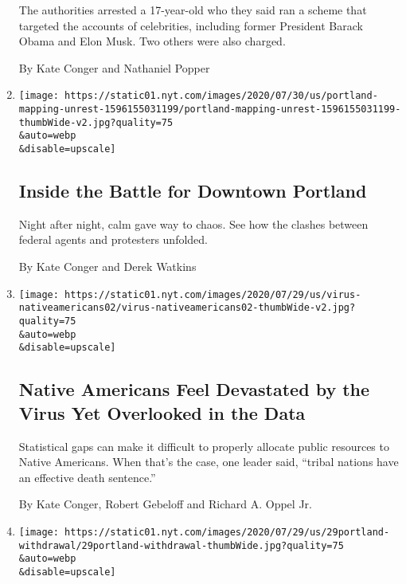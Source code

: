 \begin{enumerate}
  The authorities arrested a 17-year-old who they said ran a scheme that
  targeted the accounts of celebrities, including former President
  Barack Obama and Elon Musk. Two others were also charged.

  By Kate Conger and Nathaniel Popper
\item
  \href{/interactive/2020/07/31/us/portland-protests-map-photos.html}{}

  \texttt{[image: https://static01.nyt.com/images/2020/07/30/us/portland-mapping-unrest-1596155031199/portland-mapping-unrest-1596155031199-thumbWide-v2.jpg?quality=75\\\&auto=webp\\\&disable=upscale]}

  \hypertarget{inside-the-battle-for-downtown-portland}{%
  \subsection{Inside the Battle for Downtown
  Portland}\label{inside-the-battle-for-downtown-portland}}

  Night after night, calm gave way to chaos. See how the clashes between
  federal agents and protesters unfolded.

  By Kate Conger and Derek Watkins
\item
  \href{/2020/07/30/us/native-americans-coronavirus-data.html}{}

  \texttt{[image: https://static01.nyt.com/images/2020/07/29/us/virus-nativeamericans02/virus-nativeamericans02-thumbWide-v2.jpg?quality=75\\\&auto=webp\\\&disable=upscale]}

  \hypertarget{native-americans-feel-devastated-by-the-virus-yet-overlooked-in-the-data}{%
  \subsection{Native Americans Feel Devastated by the Virus Yet
  Overlooked in the
  Data}\label{native-americans-feel-devastated-by-the-virus-yet-overlooked-in-the-data}}

  Statistical gaps can make it difficult to properly allocate public
  resources to Native Americans. When that's the case, one leader said,
  ``tribal nations have an effective death sentence.''

  By Kate Conger, Robert Gebeloff and Richard A. Oppel Jr.
\item
  \href{/2020/07/29/us/protests-portland-federal-withdrawal.html}{}

  \texttt{[image: https://static01.nyt.com/images/2020/07/29/us/29portland-withdrawal/29portland-withdrawal-thumbWide.jpg?quality=75\\\&auto=webp\\\&disable=upscale]}


\end{enumerate}

